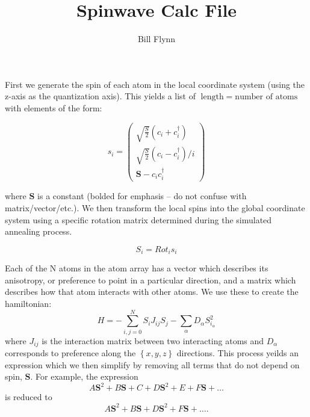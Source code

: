 \documentclass{article}[11pt]
\author{Bill Flynn}
\title{Spinwave Calc File}
\begin{document}
\maketitle


\section{}

First we generate the spin of each atom in the local coordinate system (using the z-axis as the quantization axis). This yields a list of $\mbox{length}\;=\;\mbox{number of atoms}$ with elements of the form:

\begin{equation}
	s_{i}=\left(\begin{array}{ccc}
		\sqrt{\frac{S}{2}}\left(c_i + c_i^\dagger\right) \\
		\sqrt{\frac{S}{2}}\left(c_i - c_i^\dagger\right)/i \\
		\textbf{S}-c_i c_i^\dagger 
	\end{array}\right) 
\end{equation}

where $\textbf{S}$ is a constant (bolded for emphasis -- do not confuse with matrix/vector/etc.). We then transform the local spins into the global coordinate system using a specific rotation matrix determined during the simulated annealing process.

\begin{equation}
	S_{i} = Rot_{i} s_{i}
\end{equation}

Each of the N atoms in the atom array has a vector which describes its anisotropy, or preference to point in a particular direction, and a matrix which describes how that atom interacts with other atoms. We use these to create the hamiltonian:
\begin{equation}
	H = -\displaystyle \sum_{i,j=0}^{N} S_{i} J_{ij} S_{j} - \displaystyle \sum_{\alpha}D_{\alpha}S_{i_{\alpha}}^{2}
\end{equation}
\noindent where $J_{ij}$ is the interaction matrix between two interacting atoms and $D_{\alpha}$ corresponds to preference along the $\left\{x,y,z\right\}$ directions. This process yeilds an expression which we then simplify by removing all terms that do not depend on spin, $\textbf{S}$. For example, the expression
\begin{equation}
	A\textbf{S}^{2} + B \textbf{S} + C + D \textbf{S}^{2} + E + F \textbf{S} + \ldots
\end{equation}
is reduced to 
\begin{equation}
	A\textbf{S}^{2} + B \textbf{S} + D \textbf{S}^{2} + F \textbf{S} + \ldots.
\end{equation}
\end{document}
